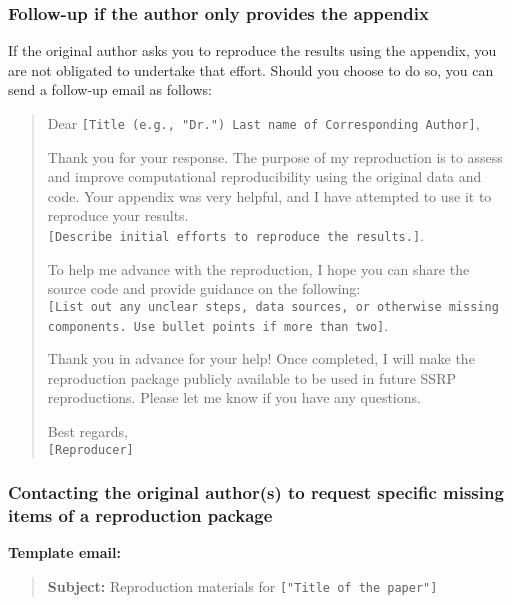\subsubsection{Follow-up if the author only provides the
appendix}

If the original author asks you to reproduce the results using the appendix, you are not obligated to undertake that effort. Should you choose to do so, you can send a follow-up email as follows:

\begin{quote}
Dear
\texttt{{[}Title\ (e.g.,\ "Dr.")\ Last\ name\ of\ Corresponding\ Author{]}},

Thank you for your response. The purpose of my reproduction is to assess
and improve computational reproducibility using the original data and
code. Your appendix was very helpful, and I have attempted to use it to
reproduce your
results.\texttt{{[}Describe\ initial\ efforts\ to\ reproduce\ the\ results.{]}}.

To help me advance with the reproduction, I hope you can share the
source code and provide guidance on the following:
\texttt{{[}List\ out\ any\ unclear\ steps,\ data\ sources,\ or\ otherwise\ missing\ components.\ Use\ bullet\ points\ if\ more\ than\ two{]}}.

Thank you in advance for your help! Once completed, I will make the
reproduction package publicly available to be used in future SSRP
reproductions. Please let me know if you have any questions.

Best regards,\\
\texttt{{[}Reproducer{]}}
\end{quote}

\subsubsection{Contacting the original author(s) to request specific
missing items of a reproduction
package}

\textbf{Template email:}

\begin{quote}
\textbf{Subject:} Reproduction materials for
\texttt{{[}"Title\ of\ the\ paper"{]}}
\end{quote}

